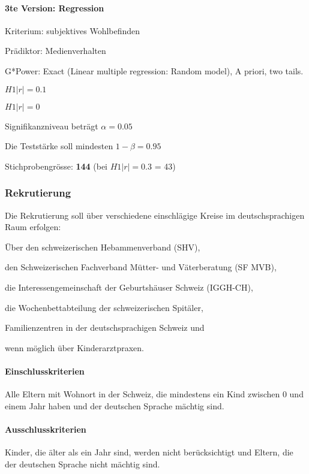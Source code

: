 \paragraph{3te Version: Regression}
\begin{APAitemize} 
    \item Kriterium: subjektives Wohlbefinden
    \item Prädiktor: Medienverhalten
    \item G*Power: Exact (Linear multiple regression: Random model), A priori, two tails.
    \item $H1 |r|=0.1$
    \item $H1 |r|=0$
    \item Signifikanzniveau beträgt $\alpha=0.05$
    \item Die Teststärke soll mindesten $1-\beta=0.95$
    \item Stichprobengrösse: \textbf{144} (bei $H1 |r|=0.3$ = 43)
\end{APAitemize}    

\subsubsection{Rekrutierung}
Die Rekrutierung soll über verschiedene einschlägige Kreise im deutschsprachigen Raum erfolgen: 
\begin{seriate}
    \item Über den schweizerischen Hebammenverband (SHV),
    \item den Schweizerischen Fachverband Mütter- und Väterberatung (SF MVB),
    \item die Interessengemeinschaft der Geburtshäuser Schweiz (IGGH-CH),
    \item die Wochenbettabteilung der schweizerischen Spitäler,
    \item Familienzentren in der deutschsprachigen Schweiz und
    \item wenn möglich über Kinderarztpraxen.
\end{seriate}
\paragraph{Einschlusskriterien}
Alle Eltern mit Wohnort in der Schweiz, die mindestens ein Kind zwischen 0 und einem Jahr haben und der deutschen Sprache mächtig sind.
\paragraph{Ausschlusskriterien}
Kinder, die älter als ein Jahr sind, werden nicht berücksichtigt und Eltern, die der deutschen Sprache nicht mächtig sind.
